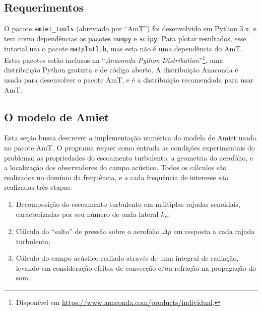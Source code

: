 \documentclass[a4paper, 11pt, twoside]{article}
\begin{document}
\subsection{Requerimentos}

O pacote \verb|amiet_tools| (abreviado por ``AmT'') foi desenvolvido em Python 3.x, e tem como dependências os pacotes \verb|numpy| e \verb|scipy|. Para plotar resultados, esse tutorial usa o pacote \verb|matplotlib|, mas esta não é uma dependência do AmT. Estes pacotes estão inclusos na ``\emph{Anaconda Python Distribution}''\footnote{Disponível em \url{https://www.anaconda.com/products/individual}.}, uma distribuição Python gratuita e de código aberto. A distribuição Anaconda é usada para desenvolver o pacote AmT, e é a distribuição recomendada para usar AmT.



\subsection{O modelo de Amiet}

Esta seção busca descrever a implementação numérica do modelo de Amiet usada no pacote AmT. O programa requer como entrada as condições experimentais do problema: as propriedades do escoamento turbulento, a geometria do aerofólio, e a localização dos observadores do campo acústico. Todos os cálculos são realizados no domínio da frequência, e a cada frequência de interesse são realizadas três etapas:

\begin{enumerate}
	\item Decomposição do escoamento turbulento em múltiplas rajadas senoidais, caracterizadas por seu número de onda lateral $k_\psi$;
	\item Cálculo do ``salto'' de pressão sobre o aerofólio $\Delta p$ em resposta a cada rajada turbulenta;
	\item Cálculo do campo acústico radiado através de uma integral de radiação, levando em consideração efeitos de convecção e/ou refração na propagação do som.
\end{enumerate}
\end{document}
